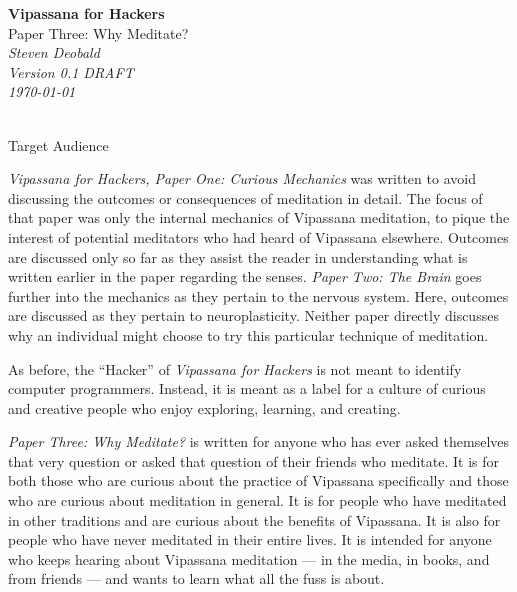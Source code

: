 \documentclass{article}
\begin{document}
\begin{titlepage}
   \begin{center}
     \Huge\textbf{Vipassana for Hackers}\\
     \Huge{Paper Three: Why Meditate?}\\
     \vspace{5cm}
     \large\textit{Steven Deobald}\\
     \large\textit{Version 0.1 DRAFT}\\
     \large\textit\today\\
     \vspace{5cm}
     \large\textit{}\\
   \end{center}
\end{titlepage}

\begin{center}
  \Huge{Target Audience}
\end{center}

\textit{Vipassana for Hackers, Paper One: Curious Mechanics} was written to avoid discussing the
outcomes or consequences of meditation in detail. The focus of that paper was only
the internal mechanics of Vipassana meditation, to pique the interest of potential
meditators who had heard of Vipassana elsewhere. Outcomes are discussed only so far
as they assist the reader in understanding what is written earlier in the paper
regarding the senses. \textit{Paper Two: The Brain} goes further into the mechanics as they pertain to the
nervous system. Here, outcomes are discussed as they pertain to
neuroplasticity. Neither paper directly discusses why an individual might choose to
try this particular technique of meditation.

As before, the ``Hacker'' of \textit{Vipassana for Hackers} is not meant to identify
computer programmers. Instead, it is meant as a label for a culture of curious and
creative people who enjoy exploring, learning, and creating.

\textit{Paper Three: Why Meditate?} is written for anyone who has ever asked
themselves that very question or asked that question of their friends who
meditate. It is for both those who are curious about the practice of Vipassana
specifically and those who are curious about meditation in general. It is for people
who have meditated in other traditions and are curious about the benefits of
Vipassana. It is also for people who have never meditated in their entire lives. It
is intended for anyone who keeps hearing about Vipassana meditation --- in the media,
in books, and from friends --- and wants to learn what all the fuss is about.
\end{document}
